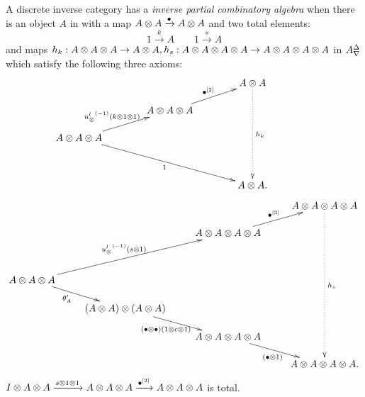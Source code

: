 \begin{definition}\label{def:inverse_partial_combinatory_algebra}
  A discrete inverse category \X has a \emph{inverse partial combinatory algebra} when there is an
   object $A$ in \X with a map $A\otimes A  \xrightarrow{\bullet} A\otimes A$ and two total elements:
  \[
      1\xrightarrow{k}A \qquad 1\xrightarrow{s}{A}
  \]
  and maps
    $h_k:A\otimes A\otimes A\to A\otimes A, h_s:A\otimes A\otimes A\otimes A\to A\otimes A\otimes A\otimes A$  in ${A}^{\Delta}_{\nabla}$ which satisfy the following
    three axioms:\\
    \[
      \xymatrix@C+15pt@R-10pt{
         && A\*A \ar@{.>}[dddd]^{h_k}\\
        &A\* A\* A \ar[ur]^{\imultibullet{2}} \\
        A\* A\*A \ar[ur]^{\inv{\usl}(k\*1\*1)\ \,} \ar[ddrr]_{1} \\
         && & \\
        && A\*A.
      }
    \]
    \[
      \xymatrix@R-10pt{
        &&& A\* A \*A\*A\ar@{.>}[dddddd]^{h_s} \\
        &&A\* A\* A\* A
          \ar[ur]^{\imultibullet{3}}\\
        && \\
        A\* A\* A \ar[uurr]^{\inv{\usl}(s\*1)} \ar[dr]_(.4){\theta_A'}\\
        &(A\* A) \* (A\* A) \ar[dr]_{(\bullet\*\bullet)(1\*c\*1)\ \,} \\
        & &A\* A\* A\*A\ar[dr]_{(\bullet\*1)}\\
        &&&A\*A\*A\*A.\\
      }
    \]
     $I\otimes A\otimes A \xrightarrow{s\otimes1\otimes1} A\otimes A\otimes A \xrightarrow{{\bullet}^{[2]}} A\otimes A\otimes A$ is total.
\end{definition}

